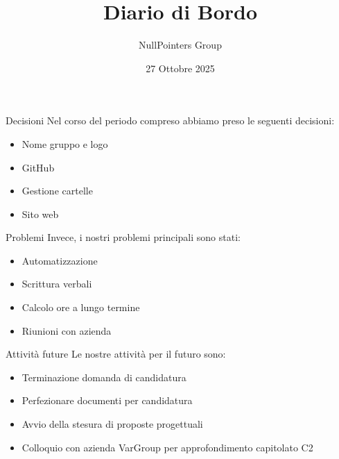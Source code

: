 \documentclass[11pt]{beamer}
\author{NullPointers Group}
\title{Diario di Bordo}
\institute{Università di Padova}
\date{27 Ottobre 2025}
\begin{document}
\begin{frame}
\titlepage
\end{frame}

\begin{frame}{Decisioni}
	Nel corso del periodo compreso abbiamo preso le seguenti decisioni:
	\begin{itemize}
		\item Nome gruppo e logo
		\item GitHub
		\item Gestione cartelle
		\item Sito web
	\end{itemize}
\end{frame}

\begin{frame}{Problemi}
	Invece, i nostri problemi principali sono stati:
	\begin{itemize}
		\item Automatizzazione
		\item Scrittura verbali
		\item Calcolo ore a lungo termine
		\item Riunioni con azienda
	\end{itemize}
\end{frame}

\begin{frame}{Attività future}
	Le nostre attività per il futuro sono:
	\begin{itemize}
		\item Terminazione domanda di candidatura
		\item Perfezionare documenti per candidatura
		\item Avvio della stesura di proposte progettuali
		\item Colloquio con azienda VarGroup per approfondimento capitolato C2
	\end{itemize}
\end{frame}
\end{document}
